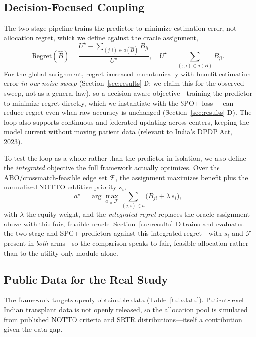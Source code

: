 \documentclass[journal]{IEEEtran}
\begin{document}
\subsection{Decision-Focused Coupling}
The two-stage pipeline trains the predictor to minimize estimation error, not allocation regret, which we define against the oracle assignment,
\begin{equation}
\mathrm{Regret}(\hat B)=\frac{U^\star-\sum_{(j,i)\in a(\hat B)}B_{ji}}{U^\star},\quad
U^\star=\!\!\sum_{(j,i)\in a(B)}\!\!B_{ji} .
\end{equation}
For the global assignment, regret increased monotonically with benefit-estimation error \emph{in our noise sweep} (Section~\ref{sec:results}-D; we claim this for the observed sweep, not as a general law), so a decision-aware objective---training the predictor to minimize regret directly, which we instantiate with the SPO+ loss~\cite{spo}---can reduce regret even when raw accuracy is unchanged (Section~\ref{sec:results}-D). The loop also supports continuous and federated updating across centers, keeping the model current without moving patient data (relevant to India's DPDP Act, 2023).

To test the loop as a whole rather than the predictor in isolation, we also define the \emph{integrated} objective the full framework actually optimizes. Over the ABO/crossmatch-feasible edge set $\mathcal{F}$, the assignment maximizes benefit plus the normalized NOTTO additive priority $s_i$,
\begin{equation}
a^\star=\arg\max_{a\subseteq\mathcal{F}}\sum_{(j,i)\in a}\big(B_{ji}+\lambda\,s_i\big),
\end{equation}
with $\lambda$ the equity weight, and the \emph{integrated regret} replaces the oracle assignment above with this fair, feasible oracle. Section~\ref{sec:results}-D trains and evaluates the two-stage and SPO+ predictors against this integrated regret---with $s_i$ and $\mathcal{F}$ present in \emph{both} arms---so the comparison speaks to fair, feasible allocation rather than to the utility-only module alone.

\subsection{Public Data for the Real Study}
The framework targets openly obtainable data (Table~\ref{tab:data}). Patient-level Indian transplant data is not openly released, so the allocation pool is simulated from published NOTTO criteria and SRTR distributions---itself a contribution given the data gap.
\end{document}
